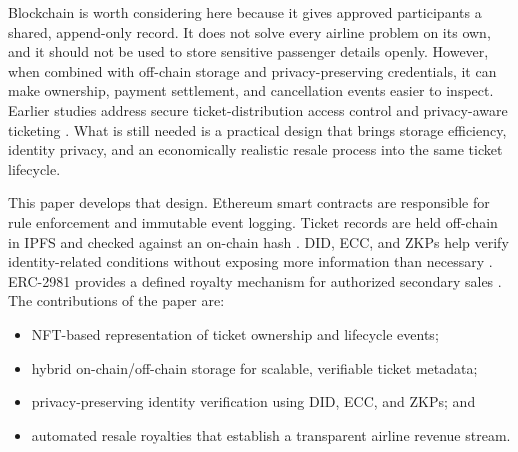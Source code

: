 \documentclass[conference]{IEEEtran}
\begin{document}
Blockchain is worth considering here because it gives approved participants a shared, append-only record. It does not solve every airline problem on its own, and it should not be used to store sensitive passenger details openly. However, when combined with off-chain storage and privacy-preserving credentials, it can make ownership, payment settlement, and cancellation events easier to inspect. Earlier studies address secure ticket-distribution access control \cite{zhang2022} and privacy-aware ticketing \cite{cha2018}. What is still needed is a practical design that brings storage efficiency, identity privacy, and an economically realistic resale process into the same ticket lifecycle.

This paper develops that design. Ethereum smart contracts are responsible for rule enforcement and immutable event logging. Ticket records are held off-chain in IPFS and checked against an on-chain hash \cite{pawar2022}. DID, ECC, and ZKPs help verify identity-related conditions without exposing more information than necessary \cite{rizwan2021,cha2018}. ERC-2981 provides a defined royalty mechanism for authorized secondary sales \cite{fekih2023}. The contributions of the paper are:
\begin{itemize}
    \item NFT-based representation of ticket ownership and lifecycle events;
    \item hybrid on-chain/off-chain storage for scalable, verifiable ticket metadata;
    \item privacy-preserving identity verification using DID, ECC, and ZKPs; and
    \item automated resale royalties that establish a transparent airline revenue stream.
\end{itemize}
\end{document}
